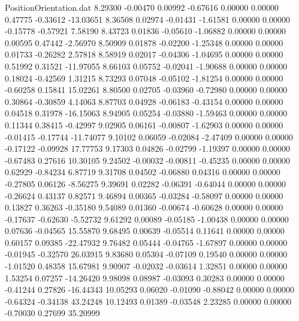 \begin{filecontents}{PositionOrientation.dat}
   8.29300   -0.00470    0.00992    -0.67616    0.00000    0.00000    0.47775   -0.33612  -13.03651
   8.36508    0.02974   -0.01431    -1.61581    0.00000    0.00000   -0.15778   -0.57921    7.58190
   8.43723    0.01836   -0.05610    -1.06882    0.00000    0.00000    0.00595    0.47442   -2.56970
   8.50909    0.01878   -0.02200    -1.25348    0.00000    0.00000    0.01733   -0.26282    2.57818
   8.58919    0.02017   -0.04306    -1.04695    0.00000    0.00000    0.51992    0.31521  -11.97055
   8.66103    0.05752   -0.02041    -1.90688    0.00000    0.00000    0.18024   -0.42569    1.31215
   8.73293    0.07048   -0.05102    -1.81254    0.00000    0.00000   -0.60258    0.15841   15.02261
   8.80500    0.02705   -0.03960    -0.72980    0.00000    0.00000    0.30864   -0.30859    4.14063
   8.87703    0.04928   -0.06183    -0.43154    0.00000    0.00000    0.04518    0.31978  -16.15063
   8.94905    0.05254   -0.03880    -1.59463    0.00000    0.00000    0.11344    0.38415   -0.42997
   9.02905    0.06161   -0.00807    -1.62903    0.00000    0.00000   -0.01415   -0.17744  -11.74077
   9.10102    0.06059   -0.02084    -2.47409    0.00000    0.00000   -0.17122   -0.09928   17.77753
   9.17303    0.04826   -0.02799    -1.19397    0.00000    0.00000   -0.67483    0.27616   10.30105
   9.24502   -0.00032   -0.00811    -0.45235    0.00000    0.00000    0.62929   -0.84234    6.87719
   9.31708    0.04502   -0.06880     0.04316    0.00000    0.00000   -0.27805    0.06126   -8.56275
   9.39691    0.02282   -0.06391    -0.64044    0.00000    0.00000   -0.26624    0.43137    0.82571
   9.46894    0.00365   -0.03284    -0.58097    0.00000    0.00000    0.13827    0.36263   -0.35180
   9.54089    0.01360   -0.00674    -0.60628    0.00000    0.00000   -0.17637   -0.62630   -5.52732
   9.61292    0.00089   -0.05185    -1.00438    0.00000    0.00000    0.07636   -0.04565   15.55870
   9.68495    0.00639   -0.05514     0.11641    0.00000    0.00000    0.60157    0.09385  -22.47932
   9.76482    0.05444   -0.04765    -1.67897    0.00000    0.00000   -0.01945   -0.32570   26.03915
   9.83680    0.05304   -0.07109     0.19540    0.00000    0.00000   -1.01520    0.48358   15.67981
   9.90907   -0.02032   -0.03614     1.32851    0.00000    0.00000    1.53254    0.07257  -14.26420
   9.98098    0.08987   -0.03093     0.30283    0.00000    0.00000   -0.41244    0.27826  -16.44343
  10.05293    0.06020   -0.01090    -0.88042    0.00000    0.00000   -0.64324   -0.34138   43.24248
  10.12493    0.01389   -0.03548     2.23285    0.00000    0.00000   -0.70030    0.27699   35.20999

\end{filecontents}
